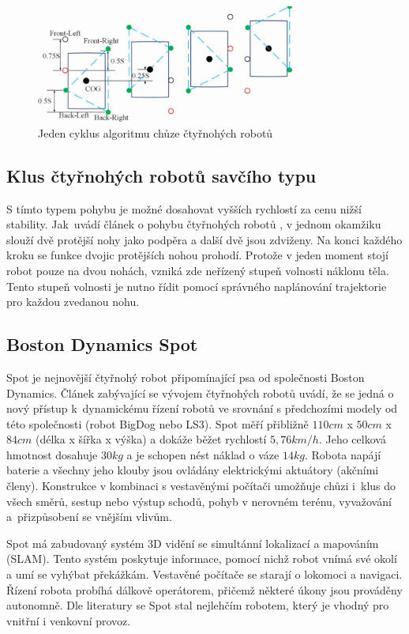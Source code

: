 \begin{figure}[hbt]
	\centering
	\includegraphics[width=0.76\textwidth]{obrazky-figures/quadWalk.png}
	\caption{Jeden cyklus algoritmu chůze čtyřnohých robotů \cite{QuadrupedWalk}}
	\label{quadWalk}
\end{figure}

\subsection*{Klus čtyřnohých robotů savčího typu}
S tímto typem pohybu je možné dosahovat vyšších rychlostí za cenu nižší stability. Jak~uvádí článek o pohybu čtyřnohých robotů \cite{QuadrupedTrot}, v jednom okamžiku slouží dvě protější nohy jako podpěra a další dvě jsou zdviženy. Na konci každého kroku se funkce dvojic protějších nohou prohodí. Protože v jeden moment stojí robot pouze na dvou nohách, vzniká zde neřízený stupeň volnosti náklonu těla. Tento stupeň volnosti je nutno řídit pomocí správného naplánování trajektorie pro každou zvedanou nohu.

\subsection*{Boston Dynamics Spot}
Spot je nejnovější čtyřnohý robot připomínající psa od společnosti Boston Dynamics. Článek zabývající se vývojem čtyřnohých robotů \cite{QuadrupedSpot} uvádí, že se jedná o nový přístup k~dynamickému řízení robotů ve srovnání s předchozími modely od této společnosti (robot BigDog nebo LS3). Spot měří přibližně $110cm$ x $50cm$ x $84cm$ (délka x šířka x výška) a dokáže běžet rychlostí $5,76km/h$. Jeho celková hmotnost dosahuje $30kg$ a je schopen nést náklad o váze $14kg$. Robota napájí baterie a všechny jeho klouby jsou ovládány elektrickými aktuátory (akčními členy). Konstrukce v kombinaci s vestavěnými počítači umožňuje chůzi i~klus do všech směrů, sestup nebo výstup schodů, pohyb v nerovném terénu, vyvažování a~přizpůsobení se vnějším vlivům.

Spot má zabudovaný systém 3D vidění se simultánní lokalizací a mapováním (SLAM).  Tento systém poskytuje informace, pomocí nichž robot vnímá své okolí a umí se vyhýbat překážkám. Vestavěné počítače se starají o lokomoci a navigaci. Řízení robota probíhá dálkově operátorem, přičemž některé úkony jsou prováděny autonomně. Dle literatury \cite{QuadrupedSpot} se Spot stal nejlehčím robotem, který je vhodný pro vnitřní i venkovní provoz.

